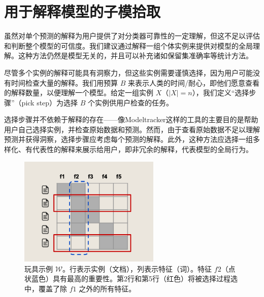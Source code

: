 \documentclass[12pt, a4paper]{ctexart} %
\begin{document}
\section{用于解释模型的子模拾取}
虽然对单个预测的解释为用户提供了对分类器可靠性的一定理解，但这不足以评估和判断整个模型的可信度。我们建议通过解释一组个体实例来提供对模型的全局理解。这种方法仍然是模型无关的，并且可以补充诸如保留集准确率等统计方法。

尽管多个实例的解释可能具有洞察力，但这些实例需要谨慎选择，因为用户可能没有时间检查大量的解释。我们用预算 \(B\) 来表示人类的时间/耐心，即他们愿意查看的解释数量，以便理解一个模型。给定一组实例 \(X\)（\(|X| = n\)），我们定义“选择步骤”（pick step）为选择 \(B\) 个实例供用户检查的任务。

选择步骤并不依赖于解释的存在——像Modeltracker这样的工具的主要目的是帮助用户自己选择实例，并检查原始数据和预测。然而，由于查看原始数据不足以理解预测并获得洞察，选择步骤应考虑每个预测的解释。此外，这种方法应选择一组多样化、有代表性的解释来展示给用户，即非冗余的解释，代表模型的全局行为。

\begin{figure}[h]
    \centering
    \includegraphics[width=0.6\textwidth]{img/img_5.png}
    \caption{玩具示例 \(\mathcal{W}\)。行表示实例（文档），列表示特征（词）。特征 \(f2\)（点状蓝色）具有最高的重要性。第2行和第5行（红色）将被选择过程选中，覆盖了除 \(f1\) 之外的所有特征。}
    \label{fig:img_5}
\end{figure}
    
\end{document}
